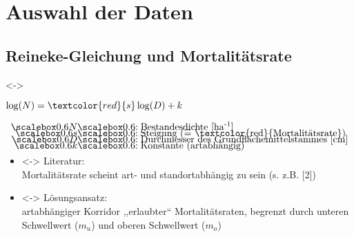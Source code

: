 \section{Auswahl der Daten}
\subsection{Reineke-Gleichung und Mortalitätsrate}
\begin{frame}[c]
  \visible<\theFirstElement->{
    \centerline{
      \(\log(N) = \textcolor{red}{s} \log(D) + k\)
    }
    
    \begin{minipage}{1.0\textwidth}
      \centerline{
      }
    \end{minipage}
    \begin{align*}
      \myscalebox{N} & \myscalebox{: \text{Bestandesdichte [ha\textsuperscript{-1}]}} \\[-3mm]
      \myscalebox{s} & \myscalebox{: \text{Steigung (}\widehat{=}\text{ \textcolor{red}{Mortalitätsrate})}} \\[-3mm]
      \myscalebox{D} & \myscalebox{: \text{Durchmesser des Grundflächemittelstammes [cm]}} \\[-3mm]
      \myscalebox{k} & \myscalebox{: \text{Konstante (artabhängig)}} \\[-3mm]
    \end{align*}}
  
  \begin{itemize}
  \item<\theSecondElement-> Literatur: \\
    Mortalitätsrate scheint art- und standortabhängig zu sein (s. z.B. [2])
  \item<\theSecondElement-> Lösungsansatz: \\
    artabhängiger Korridor ,,erlaubter`` Mortalitätsraten, begrenzt durch unteren Schwellwert (\(m_u\)) und oberen Schwellwert (\(m_o\))
  \end{itemize}
\end{frame}

